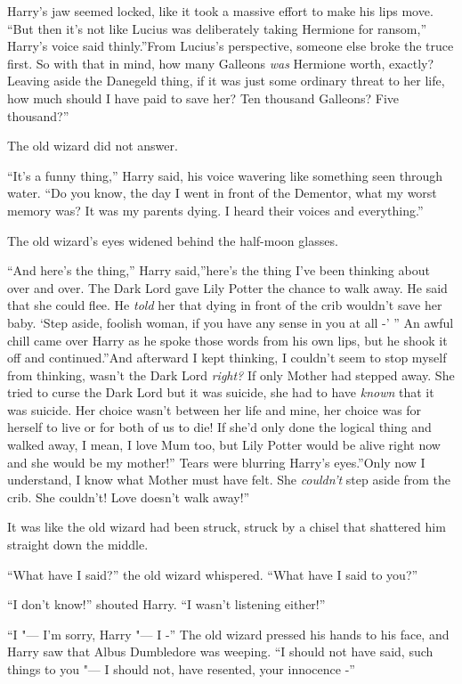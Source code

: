 Harry's jaw seemed locked, like it took a massive effort to make his
lips move. ``But then it's not like Lucius was deliberately taking
Hermione for ransom,'' Harry's voice said thinly.''From Lucius's
perspective, someone else broke the truce first. So with that in mind,
how many Galleons \emph{was} Hermione worth, exactly? Leaving aside the
Danegeld thing, if it was just some ordinary threat to her life, how
much should I have paid to save her? Ten thousand Galleons? Five
thousand?''

The old wizard did not answer.

``It's a funny thing,'' Harry said, his voice wavering like something
seen through water. ``Do you know, the day I went in front of the
Dementor, what my worst memory was? It was my parents dying. I heard
their voices and everything.''

The old wizard's eyes widened behind the half-moon glasses.

``And here's the thing,'' Harry said,''here's the thing I've been
thinking about over and over. The Dark Lord gave Lily Potter the chance
to walk away. He said that she could flee. He \emph{told} her that dying
in front of the crib wouldn't save her baby. `Step aside, foolish woman,
if you have any sense in you at all -' '' An awful chill came over Harry
as he spoke those words from his own lips, but he shook it off and
continued.''And afterward I kept thinking, I couldn't seem to stop
myself from thinking, wasn't the Dark Lord \emph{right?} If only Mother
had stepped away. She tried to curse the Dark Lord but it was suicide,
she had to have \emph{known} that it was suicide. Her choice wasn't
between her life and mine, her choice was for herself to live or for
both of us to die! If she'd only done the logical thing and walked away,
I mean, I love Mum too, but Lily Potter would be alive right now and she
would be my mother!'' Tears were blurring Harry's eyes.''Only now I
understand, I know what Mother must have felt. She \emph{couldn't} step
aside from the crib. She couldn't! Love doesn't walk away!''

It was like the old wizard had been struck, struck by a chisel that
shattered him straight down the middle.

``What have I said?'' the old wizard whispered. ``What have I said to
you?''

``I don't know!'' shouted Harry. ``I wasn't listening either!''

``I "--- I'm sorry, Harry "--- I -'' The old wizard pressed his hands to his
face, and Harry saw that Albus Dumbledore was weeping. ``I should not
have said, such things to you "--- I should not, have resented, your
innocence -''


